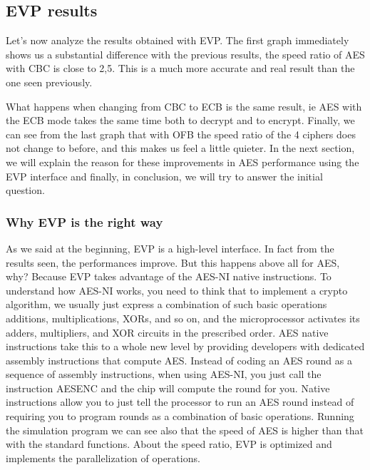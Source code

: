 \documentclass[11pt]{article}
\begin{document}
\subsection{EVP results}
Let's now analyze the results obtained with EVP.
The first graph immediately shows us a substantial difference with the previous results, the speed ratio of AES with CBC is close to 2,5. 
This is a much more accurate and real result than the one seen previously.

What happens when changing from CBC to ECB is the same result, ie AES with the ECB mode takes the same time both to decrypt and to encrypt.
Finally, we can see from the last graph that with OFB the speed ratio of the 4 ciphers does not change to before, and this makes us feel a little quieter. In the next section, we will explain the reason for these improvements in AES performance using the EVP interface and finally, in conclusion, we will try to answer the initial question.

\subsubsection{Why EVP is the right way}
As we said at the beginning, EVP is a high-level interface. In fact from the results seen, the performances improve.
But this happens above all for AES, why? Because EVP takes advantage of the AES-NI native instructions. To understand how AES-NI works, 
you need to think that to implement a crypto algorithm, we usually just express a combination of such basic operations additions, multiplications, XORs, and so on, and the microprocessor activates its adders, multipliers, and XOR circuits in the prescribed order. AES native instructions take this to a whole new level by providing developers with dedicated assembly instructions that compute AES. Instead of coding an AES round as a sequence of assembly instructions, when using AES-NI, you just call the instruction AESENC and the chip will compute the round for you. Native instructions allow you to just tell the processor to run an AES round instead of requiring you to program rounds as a combination of basic operations.
Running the simulation program we can see also that the speed of AES is higher than that with the standard functions. 
About the speed ratio, EVP is optimized and implements the parallelization of operations.
\end{document}
